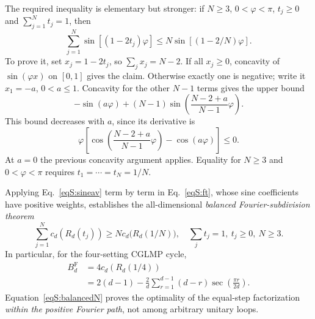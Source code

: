 \documentclass[aps,prl,reprint,superscriptaddress,nofootinbib]{revtex4-2}
\begin{document}
The required inequality is elementary but stronger: if $N\geq3$, $0<\varphi<\pi$, $t_j\geq0$ and $\sum_{j=1}^{N}t_j=1$, then
\begin{equation}
\sum_{j=1}^{N}\sin[(1-2t_j)\varphi]\leq
N\sin[(1-2/N)\varphi].
\label{eqS:sineav}
\end{equation}
To prove it, set $x_j=1-2t_j$, so $\sum_jx_j=N-2$. If all $x_j\geq0$, concavity of $\sin(\varphi x)$ on $[0,1]$ gives the claim. Otherwise exactly one is negative; write it $x_1=-a$, $0<a\leq1$. Concavity for the other $N-1$ terms gives the upper bound
\begin{equation}
-\sin(a\varphi)+(N-1)\sin\!\left(\frac{N-2+a}{N-1}\varphi\right).
\label{eqS:h}
\end{equation}
This bound decreases with $a$, since its derivative is
\begin{equation}
\varphi\left[\cos\!\left(\frac{N-2+a}{N-1}\varphi\right)-\cos(a\varphi)\right]\leq0.
\end{equation}
At $a=0$ the previous concavity argument applies. Equality for $N\geq3$ and $0<\varphi<\pi$ requires $t_1=\cdots=t_N=1/N$.

Applying Eq.~\eqref{eqS:sineav} term by term in Eq.~\eqref{eqS:ft}, whose sine coefficients have positive weights, establishes the all-dimensional \emph{balanced Fourier-subdivision theorem}
\begin{equation}
\sum_{j=1}^{N}c_d(R_d(t_j))\geq
N c_d\bigl(R_d(1/N)\bigr),\quad
\sum_jt_j=1,\ t_j\geq0,\ N\geq3.
\label{eqS:balancedN}
\end{equation}
In particular, for the four-setting CGLMP cycle,
\begin{equation}
\begin{split}
B_d^{\mathrm F}&=4c_d(R_d(1/4))\\
&=2(d-1)-\frac2d\sum_{r=1}^{d-1}(d-r)
\sec\!\left(\frac{\pi r}{2d}\right).
\end{split}
\label{eqS:BF}
\end{equation}
Equation~\eqref{eqS:balancedN} proves the optimality of the equal-step factorization \emph{within the positive Fourier path}, not among arbitrary unitary loops.
\end{document}
